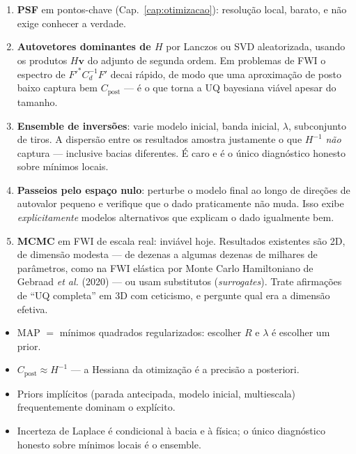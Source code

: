 \documentclass[11pt,a4paper,oneside]{report}
\begin{document}
\begin{pratica}
\begin{enumerate}[leftmargin=*, itemsep=1pt]
\item \textbf{PSF} em pontos-chave (Cap.~\ref{cap:otimizacao}): resolu\c{c}\~ao
local, barato, e n\~ao exige conhecer a verdade.
\item \textbf{Autovetores dominantes de $H$} por Lanczos ou SVD aleatorizada,
usando os produtos $H\mathbf{v}$ do adjunto de segunda ordem. Em problemas de
FWI o espectro de $F'^{*}C_d^{-1}F'$ decai r\'apido, de modo que uma
aproxima\c{c}\~ao de posto baixo captura bem $C_{\text{post}}$ --- \'e o que
torna a UQ bayesiana vi\'avel apesar do tamanho.
\item \textbf{Ensemble de invers\~oes}: varie modelo inicial, banda inicial,
$\lambda$, subconjunto de tiros. A dispers\~ao entre os resultados amostra
justamente o que $H^{-1}$ \emph{n\~ao} captura --- inclusive bacias
diferentes. \'E caro e \'e o \'unico diagn\'ostico honesto sobre m\'inimos
locais.
\item \textbf{Passeios pelo espa\c{c}o nulo}: perturbe o modelo final ao longo
de dire\c{c}\~oes de autovalor pequeno e verifique que o dado praticamente
n\~ao muda. Isso exibe \emph{explicitamente} modelos alternativos que
explicam o dado igualmente bem.
\item \textbf{MCMC} em FWI de escala real: invi\'avel hoje. Resultados
existentes s\~ao 2D, de dimens\~ao modesta --- de dezenas a algumas dezenas de
milhares de par\^ametros, como na FWI el\'astica por Monte Carlo Hamiltoniano
de Gebraad \emph{et al.} (2020) --- ou usam substitutos (\emph{surrogates}). Trate afirma\c{c}\~oes de ``UQ completa'' em 3D com
ceticismo, e pergunte qual era a dimens\~ao efetiva.
\end{enumerate}
\end{pratica}

\begin{resumo}
\begin{itemize}[leftmargin=*, itemsep=1pt]
\item MAP $=$ m\'inimos quadrados regularizados: escolher $R$ e $\lambda$ \'e
escolher um prior.
\item $C_{\text{post}} \approx H^{-1}$ --- a Hessiana da otimiza\c{c}\~ao \'e a
precis\~ao a posteriori.
\item Priors impl\'icitos (parada antecipada, modelo inicial, multiescala)
frequentemente dominam o expl\'icito.
\item Incerteza de Laplace \'e condicional \`a bacia e \`a f\'isica; o \'unico
diagn\'ostico honesto sobre m\'inimos locais \'e o ensemble.
\end{itemize}
\end{resumo}
\end{document}
